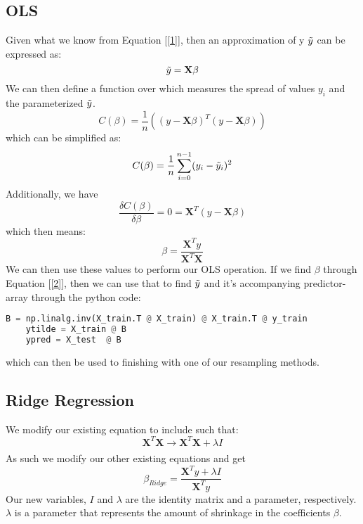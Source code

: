 \documentclass{article}
\begin{document}
\subsection{OLS}
Given what we know from Equation [\ref{1}], then an approximation of y $\Tilde{y}$ can be expressed as:
\begin{equation}
    \Tilde{y} = \mathbf{X}\beta
\end{equation}
We can then define a function over which measures the spread of values $y_i$ and the parameterized $\Tilde{y}$.
\begin{equation*}
    C(\beta) = \frac{1}{n} \left ((y-\mathbf{X}\beta)^T (y-\mathbf{X}\beta) \right)
\end{equation*}
which can be simplified as:
\begin{equation}
    C(\beta)=\frac{1}{n} \sum_{i=0}^{n-1} (y_i - \Tilde{y}_i)^2
\end{equation}
Additionally, we have
\begin{equation}
    \frac{\delta C(\beta)}{\delta \beta} = 0 = \mathbf{X}^T (y-\mathbf{X}\beta)
\end{equation}
which then means:
\begin{equation} \label{2}
    \beta = \frac{\mathbf{X}^Ty}{\mathbf{X}^T\mathbf{X}}
\end{equation}
We can then use these values to perform our OLS operation.
If we find $\beta$ through Equation [\ref{2}], then we can use that to find $\Tilde{y}$ and it's accompanying predictor-array through the python code:
\begin{lstlisting}[language=Python]
    B = np.linalg.inv(X_train.T @ X_train) @ X_train.T @ y_train
    ytilde = X_train @ B
    ypred = X_test  @ B
\end{lstlisting} \newline
which can then be used to finishing with one of our resampling methods.
\subsection{Ridge Regression}
We modify our existing equation to include such that:
\begin{equation*}
    \mathbf{X}^T\mathbf{X}\xrightarrow[]{}\mathbf{X}^T\mathbf{X}+\lambda I
\end{equation*}
As such we modify our other existing equations and get
\begin{equation} \label{3}
    \beta_{Ridge} = \frac{\mathbf{X}^Ty+\lambda I}{\mathbf{X}^Ty}
\end{equation}
Our new variables, $I$ and $\lambda$ are the identity matrix and a parameter, respectively. $\lambda$ is a parameter that represents the amount of shrinkage in the coefficients $\beta$.
\end{document}
